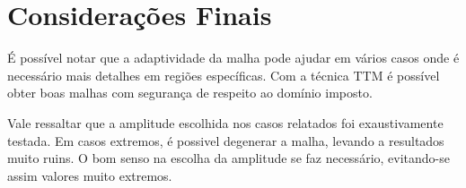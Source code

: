\documentclass{article}
\begin{document}
	\section{Considerações Finais} %
	\label{sec:considera_es_finais}
		É possível notar que a adaptividade da malha pode ajudar em vários casos onde é necessário mais detalhes em regiões específicas. Com a técnica TTM é possível obter boas malhas com segurança de respeito ao domínio imposto.

		Vale ressaltar que a amplitude escolhida nos casos relatados foi exaustivamente testada. Em casos extremos, é possivel degenerar a malha, levando a resultados muito ruins. O bom senso na escolha da amplitude se faz necessário, evitando-se assim valores muito extremos.

	
	
\end{document}
